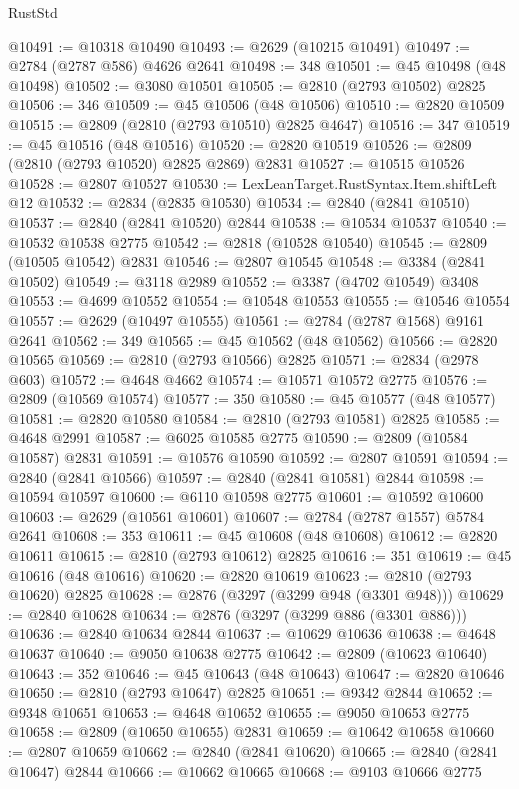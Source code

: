 \begin{lexlean}{RustStd}
\begin{coremodule}
{\begin{coremodule}
{{{{{{{{{{{{{{{{{{{{{{{{{{{{{{{{{@10491 := @10318 @10490
@10493 := @2629 (@10215 @10491)
@10497 := @2784 (@2787 @586) @4626 @2641
@10498 := 348
@10501 := @45 @10498 (@48 @10498)
@10502 := @3080 @10501
@10505 := @2810 (@2793 @10502) @2825
@10506 := 346
@10509 := @45 @10506 (@48 @10506)
@10510 := @2820 @10509
@10515 := @2809 (@2810 (@2793 @10510) @2825 @4647)
@10516 := 347
@10519 := @45 @10516 (@48 @10516)
@10520 := @2820 @10519
@10526 := @2809 (@2810 (@2793 @10520) @2825 @2869) @2831
@10527 := @10515 @10526
@10528 := @2807 @10527
@10530 := LexLeanTarget.RustSyntax.Item.shiftLeft @12
@10532 := @2834 (@2835 @10530)
@10534 := @2840 (@2841 @10510)
@10537 := @2840 (@2841 @10520) @2844
@10538 := @10534 @10537
@10540 := @10532 @10538 @2775
@10542 := @2818 (@10528 @10540)
@10545 := @2809 (@10505 @10542) @2831
@10546 := @2807 @10545
@10548 := @3384 (@2841 @10502)
@10549 := @3118 @2989
@10552 := @3387 (@4702 @10549) @3408
@10553 := @4699 @10552
@10554 := @10548 @10553
@10555 := @10546 @10554
@10557 := @2629 (@10497 @10555)
@10561 := @2784 (@2787 @1568) @9161 @2641
@10562 := 349
@10565 := @45 @10562 (@48 @10562)
@10566 := @2820 @10565
@10569 := @2810 (@2793 @10566) @2825
@10571 := @2834 (@2978 @603)
@10572 := @4648 @4662
@10574 := @10571 @10572 @2775
@10576 := @2809 (@10569 @10574)
@10577 := 350
@10580 := @45 @10577 (@48 @10577)
@10581 := @2820 @10580
@10584 := @2810 (@2793 @10581) @2825
@10585 := @4648 @2991
@10587 := @6025 @10585 @2775
@10590 := @2809 (@10584 @10587) @2831
@10591 := @10576 @10590
@10592 := @2807 @10591
@10594 := @2840 (@2841 @10566)
@10597 := @2840 (@2841 @10581) @2844
@10598 := @10594 @10597
@10600 := @6110 @10598 @2775
@10601 := @10592 @10600
@10603 := @2629 (@10561 @10601)
@10607 := @2784 (@2787 @1557) @5784 @2641
@10608 := 353
@10611 := @45 @10608 (@48 @10608)
@10612 := @2820 @10611
@10615 := @2810 (@2793 @10612) @2825
@10616 := 351
@10619 := @45 @10616 (@48 @10616)
@10620 := @2820 @10619
@10623 := @2810 (@2793 @10620) @2825
@10628 := @2876 (@3297 (@3299 @948 (@3301 @948)))
@10629 := @2840 @10628
@10634 := @2876 (@3297 (@3299 @886 (@3301 @886)))
@10636 := @2840 @10634 @2844
@10637 := @10629 @10636
@10638 := @4648 @10637
@10640 := @9050 @10638 @2775
@10642 := @2809 (@10623 @10640)
@10643 := 352
@10646 := @45 @10643 (@48 @10643)
@10647 := @2820 @10646
@10650 := @2810 (@2793 @10647) @2825
@10651 := @9342 @2844
@10652 := @9348 @10651
@10653 := @4648 @10652
@10655 := @9050 @10653 @2775
@10658 := @2809 (@10650 @10655) @2831
@10659 := @10642 @10658
@10660 := @2807 @10659
@10662 := @2840 (@2841 @10620)
@10665 := @2840 (@2841 @10647) @2844
@10666 := @10662 @10665
@10668 := @9103 @10666 @2775
}}}}}}}}}}}}}}}}}}}}}}}}}}}}}}}}}
\end{coremodule}}
\end{coremodule}
\end{lexlean}

